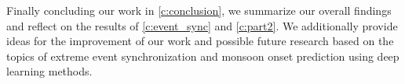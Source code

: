 Finally concluding our work in \cref{c:conclusion}, we summarize our overall findings and reflect on the results of \cref{c:event_sync} and \cref{c:part2}. We additionally provide ideas for the improvement of our work and possible future research based on the topics of extreme event synchronization and monsoon onset prediction using deep learning methods.
